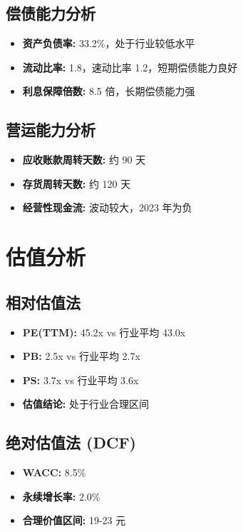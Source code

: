 \documentclass[a4paper,11pt]{article}
\begin{document}
\subsection*{偿债能力分析}
\begin{itemize}[leftmargin=*]
    \item \textbf{资产负债率:} 33.2\%，处于行业较低水平
    \item \textbf{流动比率:} 1.8，速动比率 1.2，短期偿债能力良好
    \item \textbf{利息保障倍数:} 8.5 倍，长期偿债能力强
\end{itemize}

\subsection*{营运能力分析}
\begin{itemize}[leftmargin=*]
    \item \textbf{应收账款周转天数:} 约 90 天
    \item \textbf{存货周转天数:} 约 120 天
    \item \textbf{经营性现金流:} 波动较大，2023 年为负
\end{itemize}

\newpage

\section{估值分析}

\subsection*{相对估值法}
\begin{itemize}[leftmargin=*]
    \item \textbf{PE(TTM):} 45.2x vs 行业平均 43.0x
    \item \textbf{PB:} 2.5x vs 行业平均 2.7x
    \item \textbf{PS:} 3.7x vs 行业平均 3.6x
    \item \textbf{估值结论:} 处于行业合理区间
\end{itemize}

\subsection*{绝对估值法 (DCF)}
\begin{itemize}[leftmargin=*]
    \item \textbf{WACC:} 8.5\%
    \item \textbf{永续增长率:} 2.0\%
    \item \textbf{合理价值区间:} 19-23 元
\end{itemize}
\end{document}
